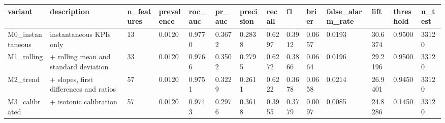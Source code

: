 \begin{tabular}{llllllllllllll}
\toprule
variant & description & n\_features & prevalence & roc\_auc & pr\_auc & precision & recall & f1 & brier & false\_alarm\_rate & lift & threshold & n\_test \\
\midrule
M0\_instantaneous & instantaneous KPIs only & 13 & 0.0120 & 0.9770 & 0.3672 & 0.2838 & 0.6297 & 0.3912 & 0.0657 & 0.0193 & 30.6374 & 0.9500 & 33120 \\
M1\_rolling & + rolling mean and standard deviation & 33 & 0.0120 & 0.9766 & 0.3502 & 0.2795 & 0.6272 & 0.3866 & 0.0664 & 0.0196 & 29.2196 & 0.9500 & 33120 \\
M2\_trend & + slopes, first differences and ratios & 57 & 0.0120 & 0.9751 & 0.3229 & 0.2611 & 0.6222 & 0.3678 & 0.0658 & 0.0214 & 26.9401 & 0.9450 & 33120 \\
M3\_calibrated & + isotonic calibration & 57 & 0.0120 & 0.9743 & 0.2976 & 0.3618 & 0.3955 & 0.3779 & 0.0097 & 0.0085 & 24.8286 & 0.1450 & 33120 \\
\bottomrule
\end{tabular}
